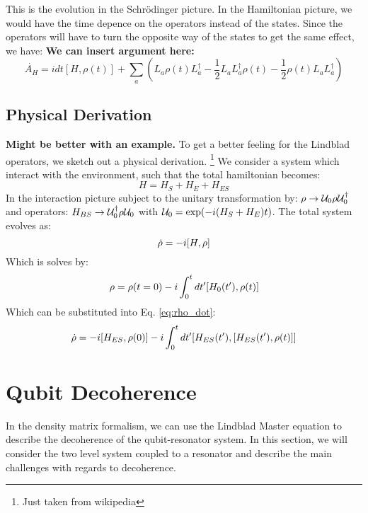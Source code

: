 This is the evolution in the Schrödinger picture. In the Hamiltonian picture, we would have the time depence on the operators instead of the states. Since the operators will have to turn the opposite way of the states to get the same effect, we have: \textbf{We can insert argument here:}
\begin{equation}
    \Dot{A_H} = i dt[H, \rho(t)] +  \sum_a \left(L_a \rho(t) L_a^\dagger - \frac12 L_a L_a^\dagger \rho(t) - \frac12 \rho(t)L_a L_a^\dagger  \right)
\end{equation}

\subsection{Physical Derivation}
\textbf{Might be better with an example.}
To get a better feeling for the Lindblad operators, we sketch out a physical derivation. \footnote{Just taken from wikipedia} We consider a system which interact with the environment, such that the total hamiltonian becomes:
\begin{equation}
    H = H_S + H_E + H_{ES}
\end{equation}
In the interaction picture subject to the unitary transformation by: $\rho \to \mathcal{U}_0 \rho \mathcal{U}_0^\dagger$ and operators: $H_{BS} \to \mathcal{U}^\dagger_0 \rho \mathcal{U}_0$ with $\mathcal{U}_0 = \exp(-i(H_S + H_E)t)$. The total system evolves as:
\begin{equation}\label{eq:rho_dot}
    \dot{\rho} = -i \comm{H}{\rho} 
\end{equation}
Which is solves by:
\begin{equation}
    \rho = \rho(t = 0) - i \int_0^t dt' \comm{H_0(t')}{\rho(t)}
\end{equation}
Which can be substituted into Eq. \ref{eq:rho_dot}:
\begin{equation}
    \dot{\rho} = -i \comm{H_{ES}}{\rho(0)} - i \int_0^t dt' \comm{H_{ES}(t')}{\comm{H_{ES}(t')}{\rho(t)}}
\end{equation}


\section{Qubit Decoherence}
In the density matrix formalism, we can use the Lindblad Master equation to describe the decoherence of the qubit-resonator system. In this section, we will consider the two level system coupled to a resonator and describe the main challenges with regards to decoherence.


